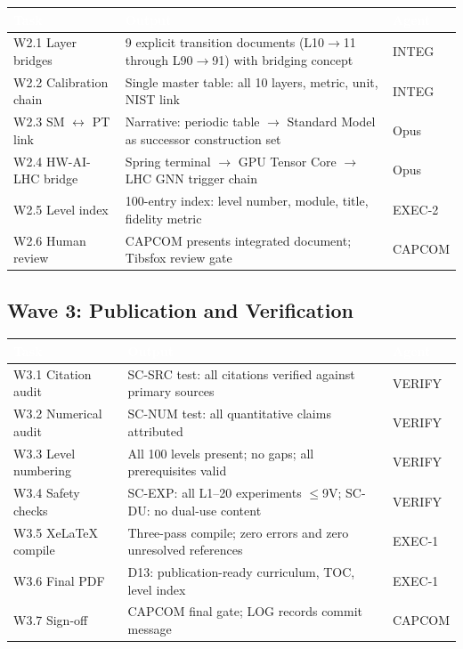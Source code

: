 \documentclass[11pt,letterpaper]{article}
\newcommand{\tableheader}[1]{\textbf{\sffamily\textcolor{white}{#1}}}
\begin{document}
\begin{center}
\begin{tabularx}{\textwidth}{L{2.5cm}XL{2cm}}
\toprule
{}
\tableheader{Task} & \tableheader{Output} & \tableheader{Agent} \\
\midrule
W2.1 Layer bridges & 9 explicit transition documents (L10$\rightarrow$11 through L90$\rightarrow$91) with bridging concept & INTEG \\
W2.2 Calibration chain & Single master table: all 10 layers, metric, unit, NIST link & INTEG \\
W2.3 SM $\leftrightarrow$ PT link & Narrative: periodic table $\rightarrow$ Standard Model as successor construction set & Opus \\
W2.4 HW-AI-LHC bridge & Spring terminal $\rightarrow$ GPU Tensor Core $\rightarrow$ LHC GNN trigger chain & Opus \\
W2.5 Level index & 100-entry index: level number, module, title, fidelity metric & EXEC-2 \\
W2.6 Human review & CAPCOM presents integrated document; Tibsfox review gate & CAPCOM \\
\bottomrule
\end{tabularx}
\end{center}

\subsection{Wave 3: Publication and Verification}

\begin{center}
\begin{tabularx}{\textwidth}{L{2.5cm}XL{2cm}}
\toprule
{}
\tableheader{Task} & \tableheader{Output} & \tableheader{Agent} \\
\midrule
W3.1 Citation audit & SC-SRC test: all citations verified against primary sources & VERIFY \\
W3.2 Numerical audit & SC-NUM test: all quantitative claims attributed & VERIFY \\
W3.3 Level numbering & All 100 levels present; no gaps; all prerequisites valid & VERIFY \\
W3.4 Safety checks & SC-EXP: all L1--20 experiments $\leq$9V; SC-DU: no dual-use content & VERIFY \\
W3.5 XeLaTeX compile & Three-pass compile; zero errors and zero unresolved references & EXEC-1 \\
W3.6 Final PDF & D13: publication-ready curriculum, TOC, level index & EXEC-1 \\
W3.7 Sign-off & CAPCOM final gate; LOG records commit message & CAPCOM \\
\bottomrule
\end{tabularx}
\end{center}
\end{document}
